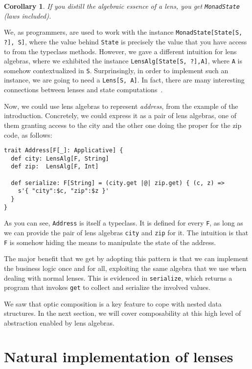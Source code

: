 \documentclass[preview, 3p]{elsarticle}
\newtheorem{corollary}{Corollary}[theorem]
\begin{document}
\begin{corollary}
If you distill the algebraic essence of a lens, you get \lstinline{MonadState}
(laws included).
\end{corollary}

We, as programmers, are used to work with the instance
\lstinline{MonadState[State[S, ?], S]}, where the value behind \lstinline{State}
is precisely the value that you have access to from the typeclass methods.
However, we gave a different intuition for lens algebras, where we exhibited the
instance \lstinline{LensAlg[State[S, ?],A]}, where \lstinline{A} is somehow
contextualized in \lstinline{S}. Surprinsingly, in order to implement such an
instance, we are going to need a \lstinline{Lens[S, A]}. In fact, there are many
interesting connections between lenses and state
computations~\cite{abou2015notions}.

Now, we could use lens algebras to represent \emph{address}, from the
example of the introduction. Concretely, we could express it as a pair of lens
algebras, one of them granting access to the city and the other one doing the
proper for the zip code, as follows: %
\begin{lstlisting}
trait Address[F[_]: Applicative] {
  def city: LensAlg[F, String]
  def zip:  LensAlg[F, Int]

  def serialize: F[String] = (city.get |@| zip.get) { (c, z) =>
    s'{ "city":$c, "zip":$z }'
  }
}
\end{lstlisting}
As you can see, \lstinline{Address} is itself a typeclass. It is defined for
every \lstinline{F}, as long as we can provide the pair of lens algebras
\lstinline{city} and \lstinline{zip} for it. The intuition is that \lstinline{F}
is somehow hiding the means to manipulate the state of the address.

The major benefit that we get by adopting this pattern is that we can implement
the business logic once and for all, exploiting the same algebra that we use
when dealing with normal lenses. This is evidenced in \lstinline{serialize},
which returns a program that invokes \lstinline{get} to collect and serialize
the involved values.

We saw that optic composition is a key feature to cope with nested data
structures. In the next section, we will cover composability at this high level
of abstraction enabled by lens algebras.

\section{Natural implementation of lenses}
\label{sec:Natural}
\end{document}
